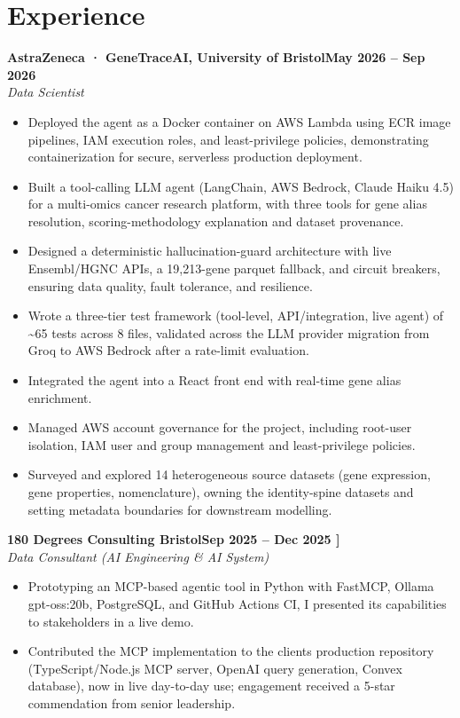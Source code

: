 \documentclass[a4paper,11pt]{article}
\newcommand{\entry}[4]{\needspace{4\baselineskip}\noindent\textbf{#1}\hfill\textbf{#2}\\ \textit{#3}\hfill\textit{#4}\par}
\begin{document}
\section{Experience}
\entry{AstraZeneca · GeneTraceAI, University of Bristol}{May 2026 – Sep 2026}{Data Scientist}{}
\begin{itemize}
  \item Deployed the agent as a Docker container on AWS Lambda using ECR image pipelines, IAM execution roles, and least-privilege policies, demonstrating containerization for secure, serverless production deployment.
  \item Built a tool-calling LLM agent (LangChain, AWS Bedrock, Claude Haiku 4.5) for a multi-omics cancer research platform, with three tools for gene alias resolution, scoring-methodology explanation and dataset provenance.
  \item Designed a deterministic hallucination-guard architecture with live Ensembl/HGNC APIs, a 19,213-gene parquet fallback, and circuit breakers, ensuring data quality, fault tolerance, and resilience.
  \item Wrote a three-tier test framework (tool-level, API/integration, live agent) of \textasciitilde{}65 tests across 8 files, validated across the LLM provider migration from Groq to AWS Bedrock after a rate-limit evaluation.
  \item Integrated the agent into a React front end with real-time gene alias enrichment.
  \item Managed AWS account governance for the project, including root-user isolation, IAM user and group management and least-privilege policies.
  \item Surveyed and explored 14 heterogeneous source datasets (gene expression, gene properties, nomenclature), owning the identity-spine datasets and setting metadata boundaries for downstream modelling.
\end{itemize}
\vspace{4pt}
\entry{180 Degrees Consulting Bristol}{Sep 2025 – Dec 2025   ]}{Data Consultant (AI Engineering \& AI System)}{}
\begin{itemize}
  \item Prototyping an MCP-based agentic tool in Python with FastMCP, Ollama gpt-oss:20b, PostgreSQL, and GitHub Actions CI, I presented its capabilities to stakeholders in a live demo.
  \item Contributed the MCP implementation to the client\textquotesingle{}s production repository (TypeScript/Node.js MCP server, OpenAI query generation, Convex database), now in live day-to-day use; engagement received a 5-star commendation from senior leadership.
\end{itemize}
\end{document}
